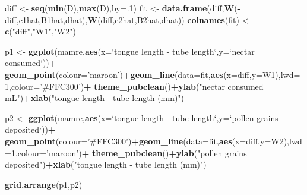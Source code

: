 \documentclass[]{article}
\newenvironment{Shaded}{\begin{snugshade}}{\end{snugshade}}
\newcommand{\DataTypeTok}[1]{\textcolor[rgb]{0.13,0.29,0.53}{#1}}
\newcommand{\DecValTok}[1]{\textcolor[rgb]{0.00,0.00,0.81}{#1}}
\newcommand{\KeywordTok}[1]{\textcolor[rgb]{0.13,0.29,0.53}{\textbf{#1}}}
\newcommand{\NormalTok}[1]{#1}
\newcommand{\OperatorTok}[1]{\textcolor[rgb]{0.81,0.36,0.00}{\textbf{#1}}}
\newcommand{\StringTok}[1]{\textcolor[rgb]{0.31,0.60,0.02}{#1}}
\begin{document}
\begin{Shaded}
\begin{Highlighting}[]
\NormalTok{diff <-}\StringTok{ }\KeywordTok{seq}\NormalTok{(}\KeywordTok{min}\NormalTok{(D),}\KeywordTok{max}\NormalTok{(D),}\DataTypeTok{by=}\NormalTok{.}\DecValTok{1}\NormalTok{)}
\NormalTok{fit <-}\StringTok{ }\KeywordTok{data.frame}\NormalTok{(diff,}\KeywordTok{W}\NormalTok{(}\OperatorTok{-}\NormalTok{diff,c1hat,B1hat,dhat),}\KeywordTok{W}\NormalTok{(diff,c2hat,B2hat,dhat))}
\KeywordTok{colnames}\NormalTok{(fit) <-}\StringTok{ }\KeywordTok{c}\NormalTok{(}\StringTok{"diff"}\NormalTok{,}\StringTok{"W1"}\NormalTok{,}\StringTok{"W2"}\NormalTok{)}

\NormalTok{p1 <-}\StringTok{ }\KeywordTok{ggplot}\NormalTok{(mamre,}\KeywordTok{aes}\NormalTok{(}\DataTypeTok{x=}\StringTok{`}\DataTypeTok{tongue length - tube length}\StringTok{`}\NormalTok{,}\DataTypeTok{y=}\StringTok{`}\DataTypeTok{nectar consumed}\StringTok{`}\NormalTok{))}\OperatorTok{+}
\StringTok{  }\KeywordTok{geom_point}\NormalTok{(}\DataTypeTok{colour=}\StringTok{'maroon'}\NormalTok{)}\OperatorTok{+}\KeywordTok{geom_line}\NormalTok{(}\DataTypeTok{data=}\NormalTok{fit,}\KeywordTok{aes}\NormalTok{(}\DataTypeTok{x=}\NormalTok{diff,}\DataTypeTok{y=}\NormalTok{W1),}\DataTypeTok{lwd=}\DecValTok{1}\NormalTok{,}\DataTypeTok{colour=}\StringTok{'#FFC300'}\NormalTok{)}\OperatorTok{+}
\StringTok{  }\KeywordTok{theme_pubclean}\NormalTok{()}\OperatorTok{+}\KeywordTok{ylab}\NormalTok{(}\StringTok{"nectar consumed mL"}\NormalTok{)}\OperatorTok{+}\KeywordTok{xlab}\NormalTok{(}\StringTok{"tongue length - tube length (mm)"}\NormalTok{)}

\NormalTok{p2 <-}\StringTok{ }\KeywordTok{ggplot}\NormalTok{(mamre,}\KeywordTok{aes}\NormalTok{(}\DataTypeTok{x=}\StringTok{`}\DataTypeTok{tongue length - tube length}\StringTok{`}\NormalTok{,}\DataTypeTok{y=}\StringTok{`}\DataTypeTok{pollen grains deposited}\StringTok{`}\NormalTok{))}\OperatorTok{+}
\StringTok{  }\KeywordTok{geom_point}\NormalTok{(}\DataTypeTok{colour=}\StringTok{'#FFC300'}\NormalTok{)}\OperatorTok{+}\KeywordTok{geom_line}\NormalTok{(}\DataTypeTok{data=}\NormalTok{fit,}\KeywordTok{aes}\NormalTok{(}\DataTypeTok{x=}\NormalTok{diff,}\DataTypeTok{y=}\NormalTok{W2),}\DataTypeTok{lwd=}\DecValTok{1}\NormalTok{,}\DataTypeTok{colour=}\StringTok{'maroon'}\NormalTok{)}\OperatorTok{+}
\StringTok{  }\KeywordTok{theme_pubclean}\NormalTok{()}\OperatorTok{+}\KeywordTok{ylab}\NormalTok{(}\StringTok{"pollen grains deposited"}\NormalTok{)}\OperatorTok{+}\KeywordTok{xlab}\NormalTok{(}\StringTok{"tongue length - tube length (mm)"}\NormalTok{)}

\KeywordTok{grid.arrange}\NormalTok{(p1,p2)}
\end{Highlighting}
\end{Shaded}
\end{document}
